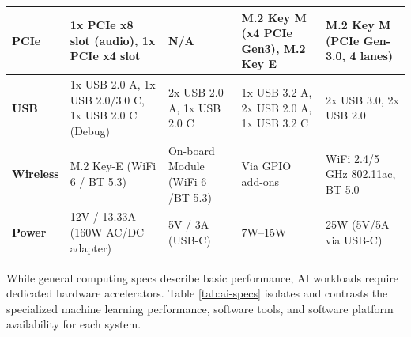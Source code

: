 \begin{table}[H]
{\begin{tabular}{p{}
                    p{}
                    p{}
                    p{}
                    p{}}
        \textbf{\acrshort{PCIe}} 
                & 1x \acrshort{PCIe} x8 slot (audio), 1x \acrshort{PCIe} x4 slot
                & N/A
                & M.2 Key M (x4 \acrshort{PCIe} Gen3), M.2 Key E 
                & M.2 Key M (\acrshort{PCIe} Gen-3.0, 4 lanes) \\
        \midrule

        \textbf{\acrshort{USB}} 
                & 1x \acrshort{USB} 2.0 A, 1x \acrshort{USB} 2.0/3.0 C, 1x \acrshort{USB} 2.0 C (Debug)
                & 2x \acrshort{USB} 2.0 A, 1x \acrshort{USB} 2.0 C
                & 1x \acrshort{USB} 3.2 A, 2x \acrshort{USB} 2.0 A, 1x \acrshort{USB} 3.2 C 
                & 2x \acrshort{USB} 3.0, 2x \acrshort{USB} 2.0 \\
        \midrule

        \textbf{Wireless} 
                & M.2 Key-E (WiFi 6 / \acrshort{BT} 5.3)
                & On-board Module (WiFi 6 /\acrshort{BT} 5.3) 
                & Via \acrshort{GPIO} add-ons 
                & WiFi 2.4/5 GHz 802.11ac, \acrshort{BT} 5.0 \\
        \midrule

        \textbf{Power} 
                & 12V / 13.33A (160W AC/DC adapter)
                & 5V / 3A (\gls{USB}-C)
                & 7W--15W 
                & 25W (5V/5A via \acrshort{USB}-C) \\
        \bottomrule
    \end{tabular}
    }
\end{table}

\clearpage

While general computing specs describe basic performance, AI workloads require dedicated hardware accelerators. Table \ref{tab:ai-specs} isolates and contrasts the specialized machine learning performance, software tools, and software platform availability for each system.

